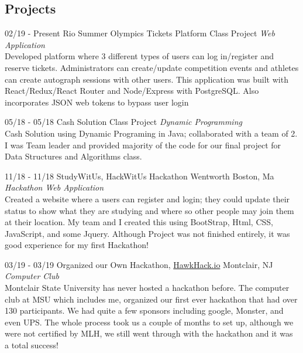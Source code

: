 \documentclass[]{friggeri-cv}
\begin{document}
\subsection{Projects}

\begin{entrylist}


\entry
{02/19 - Present }
{ Rio Summer Olympics Tickets Platform}
{Class Project}
{\emph{Web Application} \\
Developed platform where 3 different types of users can log in/register and reserve tickets. Administrators can create/update competition events and athletes can create autograph sessions with other users. This application was built with React/Redux/React Router and Node/Express with PostgreSQL. Also incorporates JSON web tokens to bypass user login  }

\entry
{05/18 - 05/18}
{Cash Solution}
{Class Project}
{\emph{Dynamic Programming} \\
Cash Solution using Dynamic Programing in Java; collaborated with a team of 2. I was Team leader and provided majority of the code for our final project for Data Structures and Algorithms class.}

\entry
{11/18 - 11/18}
{StudyWitUs, HackWitUs Hackathon}
{Wentworth Boston, Ma}
{\emph{Hackathon Web Application} \\
Created a website where a users can register and login; they could update their status to show what they are studying and where so other people may join them at their location. My team and I created this using BootStrap, Html, CSS, JavaScript, and some Jquery. Although Project was not finished entirely, it was good experience for my first Hackathon! }

\entry
{03/19 - 03/19}
{Organized our Own Hackathon, \href {http://hawkhack.io}{HawkHack.io}}
{Montclair, NJ}
{\emph{Computer Club} \\
Montclair State University has never hosted a hackathon before. The computer club at MSU which includes me, organized our first ever hackathon that had over 130 participants. We had quite a few sponsors including google, Monster, and even UPS. The whole process took us a couple of months to set up, although we were not certified by MLH, we still went through with the hackathon and it was a total success!}

\end{entrylist}
\end{document}
